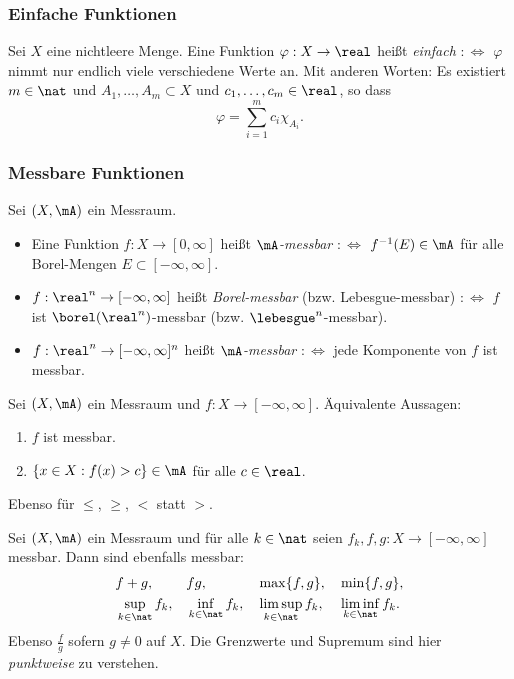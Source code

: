 \subsubsection{Einfache Funktionen}
Sei $X$ eine nichtleere Menge. Eine Funktion $\varphi: X \to \real$ heißt \emph{einfach} $:\Leftrightarrow$ $\varphi$ nimmt nur endlich viele verschiedene Werte an. Mit anderen Worten: Es existiert $m \in \nat$ und $A_1, \ldots, A_m \subset X$ und $c_1, \ldots, c_m \in \real$, so dass
\[ \varphi = \sum_{i=1}^m c_i \chi_{A_i}. \]

\subsubsection{Messbare Funktionen}
Sei $(X, \mA)$ ein Messraum.
\begin{itemize}
 \item Eine Funktion $f: X \to [0, \infty]$ heißt \emph{$\mA$-messbar} $:\Leftrightarrow$ $f^{-1}(E) \in \mA$ für alle Borel-Mengen $E \subset [-\infty,\infty]$.
 \item $f: \real^n \to [-\infty,\infty]$ heißt \emph{Borel-messbar} (bzw. Lebesgue-messbar) $:\Leftrightarrow$ $f$ ist $\borel(\real^n)$-messbar (bzw. $\lebesgue^n$-messbar).
 \item $f: \real^n \to [-\infty,\infty]^n$ heißt \emph{$\mA$-messbar} $:\Leftrightarrow$ jede Komponente von $f$ ist messbar.
\end{itemize}

\begin{rmrk}
 Sei $(X, \mA)$ ein Messraum und $f: X \to [-\infty,\infty]$. Äquivalente Aussagen:
 \begin{enumerate}
  \item $f$ ist messbar.
  \item $\{ x \in X: f(x) > c \} \in \mA$ für alle $c \in \real$.
 \end{enumerate}
 Ebenso für $\le$, $\ge$, $<$ statt $>$.
\end{rmrk}

\begin{thm}
 Sei $(X, \mA)$ ein Messraum und für alle $k \in \nat$ seien $f_k, f, g: X \to [-\infty,\infty]$ messbar. Dann sind ebenfalls messbar:
 \begin{align*}
 &f+g,& &fg,& &\max\{ f, g \},& &\min\{ f, g \}, \\ 
 &\sup_{k \in \nat} f_k, & &\inf_{k \in \nat} f_k,& &\limsup_{k \in \nat} f_k,& &\liminf_{k \in \nat} f_k.
 \end{align*}
 Ebenso $\frac{f}{g}$ sofern $g \ne 0$ auf $X$. Die Grenzwerte und Supremum sind hier \emph{punktweise} zu verstehen.
\end{thm}

